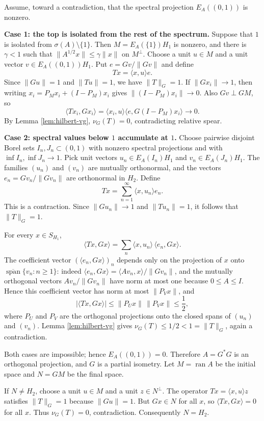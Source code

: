 \documentclass[11pt]{article}
\newcommand{\norm}[1]{\lVert #1\rVert}
\newcommand{\ran}{\operatorname{ran}}
\begin{document}
Assume, toward a contradiction, that the spectral projection
$E_A((0,1))$ is nonzero.

\medskip
\noindent
\textbf{Case 1: the top is isolated from the rest of the spectrum.}
Suppose that $1$ is isolated from $\sigma(A)\setminus\{1\}$.  Then
$M=E_A(\{1\})H_1$ is nonzero, and there is $\gamma<1$ such that
$\norm{A^{1/2}x}\le \gamma\norm{x}$ on $M^\perp$.  Choose a unit
$u\in M$ and a unit vector $v\in E_A((0,1))H_1$.  Put
$e=Gv/\norm{Gv}$ and define
\[
  T x=\langle x,u\rangle e.
\]
Since $\norm{Gu}=1$ and $\norm{Tu}=1$, we have $\norm{T}_G=1$.  If
$\norm{Gx_i}\to1$, then writing $x_i=P_Mx_i+(I-P_M)x_i$ gives
$\norm{(I-P_M)x_i}\to0$.  Also $Gv\perp G M$, so
\[
  \langle T x_i,Gx_i\rangle
  =\langle x_i,u\rangle \langle e,G(I-P_M)x_i\rangle \to0.
\]
By Lemma \ref{lem:hilbert-vg}, $\nu_G(T)=0$, contradicting relative spear.

\medskip
\noindent
\textbf{Case 2: spectral values below $1$ accumulate at $1$.}
Choose pairwise disjoint Borel sets $I_n,J_n\subset(0,1)$ with nonzero spectral
projections and with $\inf I_n,\inf J_n\to1$.  Pick unit vectors
$u_n\in E_A(I_n)H_1$ and $v_n\in E_A(J_n)H_1$.  The families $(u_n)$ and
$(v_n)$ are mutually orthonormal, and the vectors
$e_n=Gv_n/\norm{Gv_n}$ are orthonormal in $H_2$.  Define
\[
  T x=\sum_{n=1}^\infty \langle x,u_n\rangle e_n .
\]
This is a contraction.  Since $\norm{G u_n}\to1$ and $\norm{T u_n}=1$, it
follows that $\norm{T}_G=1$.

For every $x\in S_{H_1}$,
\[
  \langle T x,Gx\rangle
  =\sum_n \langle x,u_n\rangle\, \langle e_n,Gx\rangle .
\]
The coefficient vector
$(\langle e_n,Gx\rangle)_n$ depends only on the projection of $x$ onto
$\overline{\operatorname{span}}\{v_n:n\ge1\}$: indeed
$\langle e_n,Gx\rangle=\langle A v_n,x\rangle/\norm{Gv_n}$, and the mutually
orthogonal vectors $A v_n/\norm{Gv_n}$ have norm at most one because
$0\le A\le I$.  Hence this coefficient vector has norm at most
$\|P_Vx\|$, and
\[
  |\langle T x,Gx\rangle|
  \le
  \|P_Ux\|\,\|P_Vx\|
  \le \frac12,
\]
where $P_U$ and $P_V$ are the orthogonal projections onto the closed spans of
$(u_n)$ and $(v_n)$.  Lemma \ref{lem:hilbert-vg} gives
$\nu_G(T)\le1/2<1=\norm{T}_G$, again a contradiction.

Both cases are impossible; hence $E_A((0,1))=0$.  Therefore
$A=G^*G$ is an orthogonal projection, and $G$ is a partial isometry.  Let
$M=\ran A$ be the initial space and $N=GM$ be the final space.

If $N\ne H_2$, choose a unit $u\in M$ and a unit $z\in N^\perp$.  The operator
$T x=\langle x,u\rangle z$ satisfies $\norm{T}_G=1$ because $\norm{Gu}=1$.
But $Gx\in N$ for all $x$, so
$\langle Tx,Gx\rangle=0$ for all $x$.  Thus $\nu_G(T)=0$, contradiction.
Consequently $N=H_2$.
\end{document}
